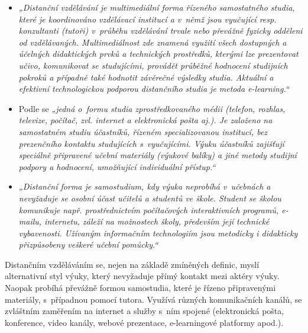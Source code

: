 \documentclass[
print,
  11pt,
  table,   
  nolof,    
  nolot,
  oneside,
  draft
]{fithesis3}
\begin{document}
      \begin{itemize}
	\item \emph{„Distanční vzdělávání je multimediální forma řízeného samostatné\-ho studia, které je koordinováno vzdělávací institucí a v~němž jsou vyučující resp. konzultanti (tutoři) v~průběhu vzdělávání trvale nebo převážně fyzicky odděleni od vzdělávaných. Multimediálnost zde znamená využití všech dostupných a účelných didaktických prvků a technických prostředků, kterými lze prezentovat učivo, komunikovat se studujícími, provádět průběžné hodnocení studijních pokroků a případně také hodnotit závěrečné výsledky studia. Aktuální a efektivní technologickou podporou distančního studia je metoda e-learn\-ing.“} \cite{zlamalova} 
	\item Podle \cite{prucha} se \emph{„jedná o~formu studia zprostředkovaného médii (telefon, rozhlas, televize, počítač, zvl. internet a elektronická pošta aj.). Je založeno na samostatném studiu účastníků, řízeném specializovanou institucí, bez prezenčního kontaktu studujících s~vyučujícími. Výuku účastníků zajišťují speciálně připravené učební materiály (výukové balíky) a jiné metody studijní podpory a hodnocení, umožňující individuální přístup.“} 
	\item \emph{„Distanční forma je samostudium, kdy výuka neprobíhá v~učebnách a nevyžaduje se osobní účast učitelů a studentů ve škole. Student se školou komunikuje např. prostřednictvím počítačových interaktivních programů, e-mailu, internetu, záleží na  možnostech školy, především její technické vybavenosti. Užívaným informačním technologiím jsou metodicky i didakticky přizpůsobeny veškeré učební pomůcky.“} \cite{nuov}
     \end{itemize}

Distančním vzděláváním se, nejen na základě zmíněných definic, myslí alternativní styl výuky, který nevyžaduje přímý kontakt mezi aktéry výuky. Naopak probíhá převážně formou samostudia, které je řízeno připravenými materiály, s~případnou pomocí tutora. Využívá různých komunikačních kanálů, se zvláštním zaměřením na internet a služby s~ním spojené (elektronická pošta, konference, video kanály, webové prezentace, e-learn\-ingové platformy apod.).
\end{document}
